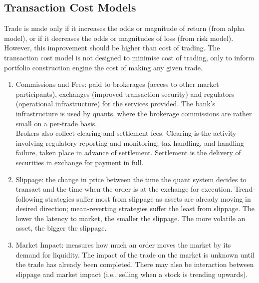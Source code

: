 \subsection{Transaction Cost Models}

Trade is made only if it increases the odds or magnitude of return (from alpha model), or if it decreases the odds or magnitudes of loss (from risk model). However, this improvement should be higher than cost of trading. The transaction cost model is not designed to minimise cost of trading, only to inform portfolio construction engine the cost of making any given trade.

\begin{remark} 
\begin{enumerate}[label=\roman*.]
\setlength{\itemsep}{0pt}
\item Commissions and Fees: paid to brokerages (access to other market participants), exchanges (improved transaction security) and regulators (operational infrastructure) for the services provided. The bank's infrastructure is used by quants, where the brokerage commissions are rather small on a per-trade basis.\\
Brokers also collect clearing and settlement fees. Clearing is the activity involving regulatory reporting and monitoring, tax handling, and handling failure, taken place in advance of settlement. Settlement is the delivery of securities in exchange for payment in full.
\item Slippage: the change in price between the time the quant system decides to transact and the time when the order is at the exchange for execution. Trend-following strategies suffer most from slippage as assets are already moving in desired direction; mean-reverting strategies suffer the least from slippage. The lower the latency to market, the smaller the slippage. The more volatile an asset, the bigger the slippage.
\item Market Impact: measures how much an order moves the market by its demand for liquidity. The impact of the trade on the market is unknown until the trade has already been completed. There may also be interaction between slippage and market impact (i.e., selling when a stock is trending upwards).
\end{enumerate}
\end{remark}


